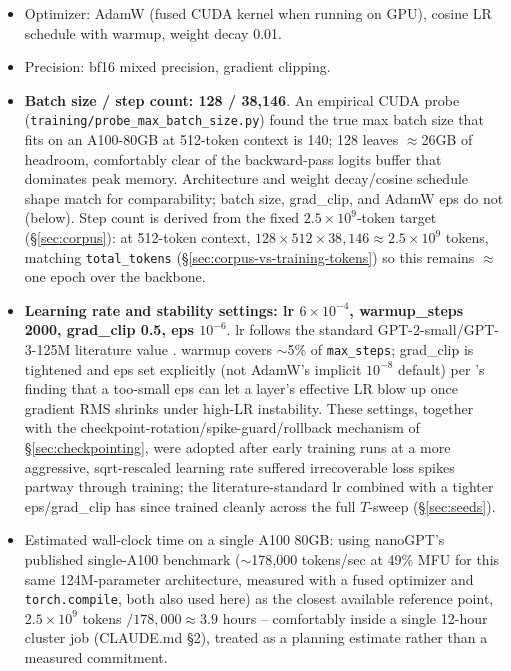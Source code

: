 \documentclass[11pt]{article}
\begin{document}
\begin{itemize}
  \item Optimizer: AdamW (fused CUDA kernel when running on GPU), cosine LR
    schedule with warmup, weight decay 0.01.
  \item Precision: bf16 mixed precision, gradient clipping.
  \item \textbf{Batch size / step count: 128 / 38{,}146}. An empirical CUDA
    probe (\texttt{training/probe\_max\_batch\_size.py}) found the true max
    batch size that fits on an A100-80GB at 512-token context is 140;
    128 leaves $\approx$26GB of headroom, comfortably clear of the backward-pass
    logits buffer that dominates peak memory. Architecture and weight
    decay/cosine schedule shape match \citet{allenzhu2023physics} for
    comparability; batch size, grad\_clip, and AdamW eps do not (below). Step
    count is derived from the fixed $2.5\times10^9$-token target
    (\S\ref{sec:corpus}): at 512-token context, $128 \times 512 \times
    38{,}146 \approx 2.5\times10^9$ tokens, matching
    \texttt{total\_tokens} (\S\ref{sec:corpus-vs-training-tokens}) so this
    remains $\approx$one epoch over the backbone.
  \item \textbf{Learning rate and stability settings: lr $6\times10^{-4}$,
    warmup\_steps 2000, grad\_clip 0.5, eps $10^{-6}$}. lr follows the
    standard GPT-2-small/GPT-3-125M literature value
    \citep{radford2019language, brown2020gpt3}. warmup covers $\sim$5\% of
    \texttt{max\_steps}; grad\_clip is tightened and eps set explicitly (not
    AdamW's implicit $10^{-8}$ default) per \citet{wortsman2024smallscale}'s
    finding that a too-small eps can let a layer's effective LR blow up once
    gradient RMS shrinks under high-LR instability. These settings, together
    with the checkpoint-rotation/spike-guard/rollback mechanism of
    \S\ref{sec:checkpointing}, were adopted after early training runs at a
    more aggressive, sqrt-rescaled learning rate suffered irrecoverable loss
    spikes partway through training; the literature-standard lr combined
    with a tighter eps/grad\_clip has since trained cleanly across the full
    $T$-sweep (\S\ref{sec:seeds}).
  \item Estimated wall-clock time on a single A100 80GB: using nanoGPT's
    published single-A100 benchmark ($\sim$178,000 tokens/sec at 49\% MFU
    for this same 124M-parameter architecture, measured with a fused
    optimizer and \texttt{torch.compile}, both also used here) as the
    closest available reference point, $2.5\times10^9$ tokens $/ 178{,}000
    \approx 3.9$ hours -- comfortably inside a single 12-hour cluster job
    (CLAUDE.md \S2), treated as a planning estimate rather than a measured
    commitment.
\end{itemize}
\end{document}
